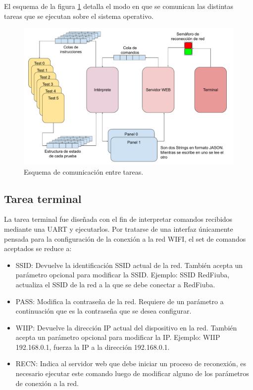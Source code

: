 El esquema de la figura \ref{fig:ComuTareas} detalla el modo en que se comunican las distintas tareas que se ejecutan sobre el sistema operativo.

\begin{figure}[H]
	\centering
	\includegraphics[width=1\textwidth]{./Figures/ComuTareas.pdf}
	\caption{Esquema de comunicación entre tareas.}
	\label{fig:ComuTareas}
\end{figure}



\subsection{Tarea terminal}

La tarea terminal fue diseñada con el fin de interpretar comandos recibidos mediante una UART y ejecutarlos. Por tratarse de una interfaz únicamente pensada para la configuración de la conexión a la red WIFI, el set de comandos aceptados se reduce a:
\begin{itemize}
	\item SSID: Devuelve la identificación SSID actual de la red. También acepta un parámetro opcional para modificar la SSID. Ejemplo: SSID RedFiuba, actualiza el SSID de la red a la que se debe conectar a RedFiuba.
	\item PASS: Modifica la contraseña de la red. Requiere de un parámetro a continuación que es la contraseña que se desea configurar.
	\item WIIP: Devuelve la dirección IP actual del dispositivo en la red. También acepta un parámetro opcional para modificar la IP. Ejemplo: WIIP 192.168.0.1, fuerza la IP a la dirección 192.168.0.1.
	\item RECN: Indica al servidor web que debe iniciar un proceso de reconexión, es necesario ejecutar este comando luego de modificar alguno de los parámetros de conexión a la red.
\end{itemize}	

